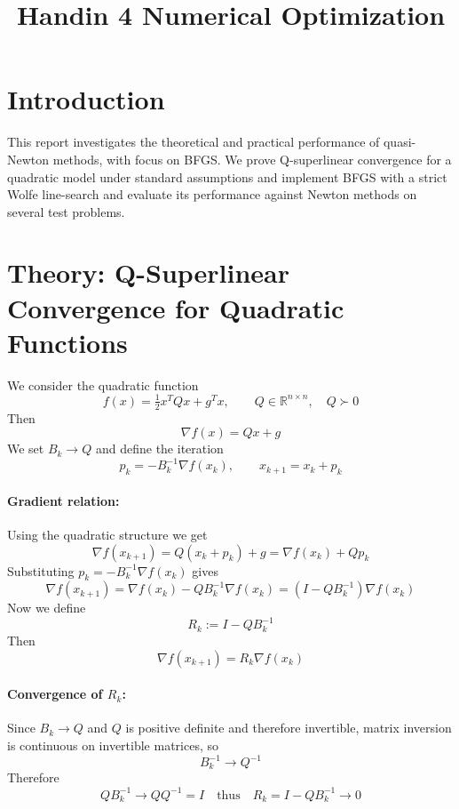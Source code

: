 \documentclass[11pt,a4paper]{article}
\title{\LARGE \textbf{Handin 4 Numerical Optimization}}
\date{}
\begin{document}
\maketitle

\section{Introduction}

This report investigates the theoretical and practical performance of quasi-Newton methods, with focus on BFGS. We prove Q-superlinear convergence for a quadratic model under standard assumptions and implement BFGS with a strict Wolfe line-search and evaluate its performance against Newton methods on several test problems.

\section{Theory: Q-Superlinear Convergence for Quadratic Functions}

We consider the quadratic function
\[
f(x) = \tfrac12 x^T Q x + g^T x,
\qquad Q \in \mathbb{R}^{n\times n}, \quad Q \succ 0
\]
Then
\[
\nabla f(x) = Qx + g
\]
We set $B_k \to Q$ and define the iteration
\[
p_k = -B_k^{-1}\nabla f(x_k),
\qquad
x_{k+1} = x_k + p_k
\]

\paragraph{Gradient relation:} Using the quadratic structure we get
\[
\nabla f(x_{k+1})
= Q(x_k + p_k) + g
= \nabla f(x_k) + Qp_k
\]
Substituting $p_k = -B_k^{-1}\nabla f(x_k)$ gives
\[
\nabla f(x_{k+1})
= \nabla f(x_k) - Q B_k^{-1} \nabla f(x_k)
= (I - Q B_k^{-1}) \nabla f(x_k)
\]
Now we define
\[
R_k := I - Q B_k^{-1}
\]
Then
\[
\nabla f(x_{k+1}) = R_k \nabla f(x_k)
\]

\paragraph{Convergence of $R_k$:} Since $B_k \to Q$ and $Q$ is positive definite and therefore invertible, matrix inversion is continuous on invertible matrices, so
\[
B_k^{-1} \to Q^{-1}
\]
Therefore
\[
Q B_k^{-1} \to QQ^{-1} = I \quad \text{thus} \quad R_k = I - Q B_k^{-1} \to 0
\]
\end{document}
